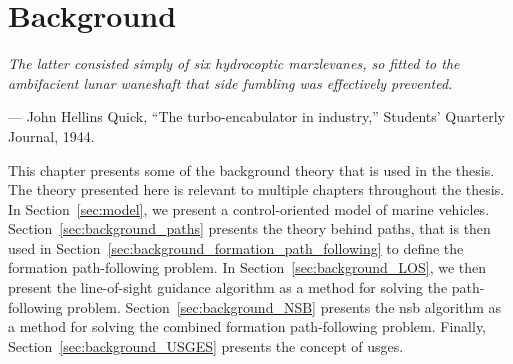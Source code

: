 \chapter{Background}
\label{chap:background}

\setlength{\epigraphwidth}{0.7\textwidth}
\epigraph{ \it
    The latter consisted simply of six hydrocoptic marzlevanes, so fitted to the ambifacient lunar waneshaft that side fumbling was effectively prevented.
}{--- John Hellins Quick, ``The turbo-encabulator in industry,'' Students' Quarterly Journal, 1944.}

This chapter presents some of the background theory that is used in the thesis.
The theory presented here is relevant to multiple chapters throughout the thesis.
In Section~\ref{sec:model}, we present a control-oriented model of marine vehicles.
Section~\ref{sec:background_paths} presents the theory behind paths, that is then used in Section~\ref{sec:background_formation_path_following} to define the formation path-following problem.
In Section~\ref{sec:background_LOS}, we then present the line-of-sight guidance algorithm as a method for solving the path-following problem.
Section~\ref{sec:background_NSB} presents the \gls{nsb} algorithm as a method for solving the combined formation path-following problem.
Finally, Section~\ref{sec:background_USGES} presents the concept of \acrlong{usges}.







